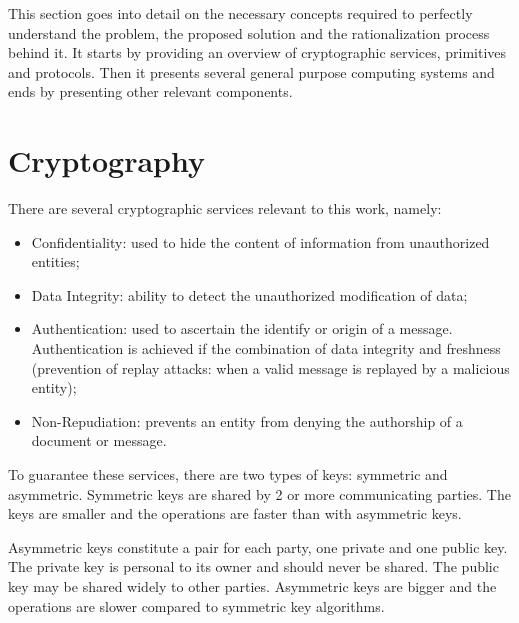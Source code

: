\cleardoublepage
\label{chap:background}

This section goes into detail on the necessary concepts required to perfectly understand the problem, the proposed solution and the rationalization process behind it. It starts by providing an overview of cryptographic services, primitives and protocols. Then it presents several general purpose computing systems and ends by presenting other relevant components.

\section{Cryptography}  \label{chap:background:crypto}

There are several cryptographic services relevant to this work, namely:
\begin{itemize}
    \item Confidentiality: used to hide the content of information from unauthorized entities;
    
    \item Data Integrity: ability to detect the unauthorized modification of data;
    
    \item Authentication: used to ascertain the identify or origin of a message. Authentication is achieved if the combination of data integrity and freshness (prevention of replay attacks: when a valid message is replayed by a malicious entity);
    
    \item Non-Repudiation: prevents an entity from denying the authorship of a document or message.
\end{itemize}

To  guarantee these services, there are two types of keys: symmetric and asymmetric.
Symmetric keys are shared by 2 or more communicating parties. The keys are smaller and the operations are faster than with asymmetric keys.

Asymmetric keys constitute a pair for each party, one private and one public key. The private key is personal to its owner and should never be shared. The public key may be shared widely to other parties. Asymmetric keys are bigger and the operations are slower compared to symmetric key algorithms.

